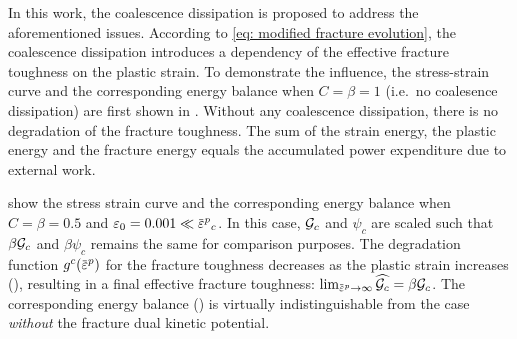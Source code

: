 In this work, the coalescence dissipation is proposed to address the aforementioned issues. According to \eqref{eq: modified fracture evolution}, the coalescence dissipation introduces a dependency of the effective fracture toughness on the plastic strain.
To demonstrate the influence, the stress-strain curve and the corresponding energy balance when $C = \beta = 1$ (i.e.\ no coalesence dissipation) are first shown in .  Without any coalescence dissipation, there is no degradation of the fracture toughness.
The sum of the strain energy, the plastic energy and the fracture energy equals the accumulated power expenditure due to external work.

 show the stress strain curve and the corresponding energy balance when $C = \beta = 0.5$ and $\varepsilon_0 = 0.001 \ll \ep_c$.
In this case, ${\mathcal{G}_c}$ and $\psi_c$ are scaled such that $\beta{\mathcal{G}_c}$ and $\beta\psi_c$ remains the same for comparison purposes.
The degradation function $g^c(\ep)$ for the fracture toughness decreases as the plastic strain increases (), resulting in a final effective fracture toughness: $\lim_{\ep \to \infty} \widehat{\Gc} = \beta \Gc$.
The corresponding energy balance () is virtually indistinguishable from the case \textit{without} the fracture dual kinetic potential.



